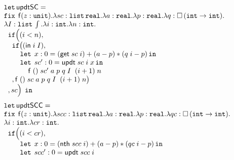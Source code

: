 \begin{figure}
\small
\[
\begin{array}{l}
\mathop{\mathtt{let}} \mathsf{updtSC} =\\
                 \mathop{\mathtt{fix}} \;  \mathsf{f}(z: \mathtt{unit}). \lambda sc: \mathtt{list} \, \mathtt{real}. 
                 \lambda a: \mathtt{real}. \lambda p: \mathtt{real}. \lambda q: \mathtt{\square} \, (\mathtt{int} \to \mathtt{int}).\\
                 \lambda I: \mathtt{list} \, \int. \lambda i: \mathtt{int}. \lambda n: \mathtt{int}. \\
 \hspace{.2cm}   \mathtt{if} \Big ( (i < n)  ,  \\
 \hspace{0.4cm}  \mathtt{if} \big( ( \mathsf{in} \; i \; I  ) ,       \\
 \hspace{0.8cm}  \mathop{\mathtt{let}} \; x: 0 =( \mathsf{get} \; sc \; i) 
                 + (a-p)*(q \; i - p)  \mathop{ \mathtt{in}} \\
 \hspace{0.8cm}  \mathop{\mathtt{let}} \; sc': 0 =  \mathsf{updt} \; sc \; i
                 \; x \mathop{ \mathtt{in}} \\
 \hspace{1.2cm}  \mathsf{f}  \; () \; sc' \; a \; p
                 \; q \; I \;  \; (i+1) \; n  \\ 
 \hspace{0.4cm}  , \mathsf{f}  \; () \; sc \; a \; p
                 \; q \; I \;  \; (i+1) \; n \big )  \\ 
 \hspace{0.2cm}  , sc  \Big ) \; \mathop{ \mathtt{in}}
\end{array}
\]
%
%
\[
\begin{array}{l}
\mathop{\mathtt{let}} \mathsf{updtSCC} = \\
                \mathop{\mathtt{fix}} \;  \mathsf{f}(z: \mathtt{unit}). \lambda scc: \mathtt{list} \, \mathtt{real}. \lambda a: \mathtt{real}. 
                \lambda p: \mathtt{real}. \lambda qc: \mathtt{\square} \, (\mathtt{int} \to \mathtt{int}).\\ 
                \lambda i: \mathtt{int}. \lambda cr: \mathtt{int}. \\
 \hspace{.2cm}  \mathtt{if} \Big ( (i < cr) ,  \\
 \hspace{0.8cm} \mathop{\mathtt{let}} \; x: 0 =( \mathsf{nth} \; scc \; i) 
                + (a-p)*(qc \; i - p)  \mathop{ \mathtt{in}} \\
 \hspace{0.8cm} \mathop{\mathtt{let}} \; scc': 0 =  \mathsf{updt} \; scc \; i

\end{array}\]
\end{figure}
